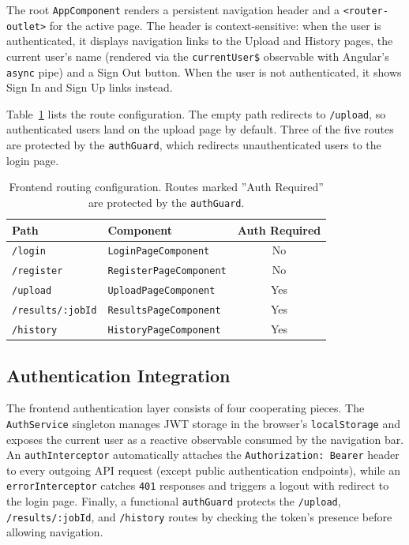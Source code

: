 The root \texttt{AppComponent} renders a persistent navigation header and a \texttt{<rou\-ter-out\-let>} for the active page. The header is context-sensitive: when the user is authenticated, it displays navigation links to the Upload and History pages, the current user's name (rendered via the \texttt{currentUser\$} observable with Angular's \texttt{async} pipe) and a Sign Out button. When the user is not authenticated, it shows Sign In and Sign Up links instead.

Table~\ref{tab:frontend-routes} lists the route configuration. The empty path redirects to \texttt{/upload}, so authenticated users land on the upload page by default. Three of the five routes are protected by the \texttt{authGuard}, which redirects unauthenticated users to the login page.

\begin{table}[htbp]
    \centering
    \footnotesize
    \begin{tabular}{|l|l|c|}
        \hline
        \textbf{Path}            & \textbf{Component}             & \textbf{Auth Required} \\
        \hline\hline
        \texttt{/login}          & \texttt{LoginPageComponent}    & No                     \\
        \hline
        \texttt{/register}       & \texttt{RegisterPageComponent} & No                     \\
        \hline
        \texttt{/upload}         & \texttt{UploadPageComponent}   & Yes                    \\
        \hline
        \texttt{/results/:jobId} & \texttt{ResultsPageComponent}  & Yes                    \\
        \hline
        \texttt{/history}        & \texttt{HistoryPageComponent}  & Yes                    \\
        \hline
    \end{tabular}
    \caption{Frontend routing configuration. Routes marked ''Auth Required'' are protected by the \texttt{authGuard}.}
    \label{tab:frontend-routes}
\end{table}

\subsection{Authentication Integration}
\label{subsec:frontend-auth}

\par The frontend authentication layer consists of four cooperating pieces. The \texttt{AuthService} singleton manages JWT storage in the browser's \texttt{localStorage} and exposes the current user as a reactive observable consumed by the navigation bar. An \texttt{authInterceptor} automatically attaches the \texttt{Authorization: Bearer} header to every outgoing API request (except public authentication endpoints), while an \texttt{errorInterceptor} catches \texttt{401} responses and triggers a logout with redirect to the login page. Finally, a functional \texttt{authGuard} protects the \texttt{/upload}, \texttt{/results/:jobId}, and \texttt{/history} routes by checking the token's presence before allowing navigation.

